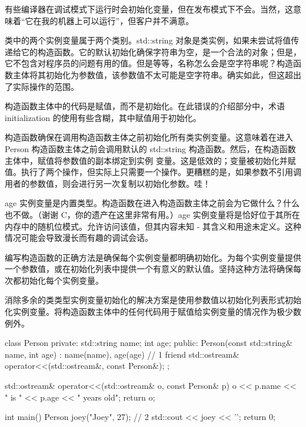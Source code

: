 有些编译器在调试模式下运行时会初始化变量，但在发布模式下不会。当然，这意味着“它在我的机器上可以运行”，但客户并不满意。


类中的两个实例变量属于两个类别。std::string 对象是类实例，如果未尝试将值传递给它的构造函数。它的默认初始化确保字符串为空，是一个合法的对象；但是，它不包含对程序员的问题有用的值。但是等等，名称怎么会是空字符串呢？构造函数主体将其初始化为参数值，该参数值不太可能是空字符串。确实如此，但这超出了实际操作的范围。

构造函数主体中的代码是赋值，而不是初始化。在此错误的介绍部分中，术语 initialization 的使用有些含糊，其中赋值用于初始化。

构造函数确保在调用构造函数主体之前初始化所有类实例变量。这意味着在进入 Person 构造函数主体之前会调用默认的 std::string 构造函数。然后，在构造函数主体中，赋值将参数值的副本绑定到实例 变量。这是低效的；变量被初始化并赋值。执行了两个操作，但实际上只需要一个操作。更糟糕的是，如果参数不引用调用者的参数值，则会进行另一次复制以初始化参数。哇！

age 实例变量是内置类型。构造函数在进入构造函数主体之前会为它做什么？什么也不做。（谢谢 C，你的遗产在这里非常有用。）age 实例变量将是恰好位于其所在内存中的随机位模式。允许访问该值，但其内容未知 - 其含义和用途未定义。这种情况可能会导致漫长而有趣的调试会话。


编写构造函数的正确方法是确保每个实例变量都明确初始化。为每个实例变量提供一个参数值，或在初始化列表中提供一个有意义的默认值。坚持这种方法将确保每次都初始化每个实例变量。

消除多余的类类型实例变量初始化的解决方案是使用参数值以初始化列表形式初始化实例变量。将构造函数主体中的任何代码用于赋值给实例变量的情况作为极少数例外。


\begin{cpp}
class Person {
private:
  std::string name;
  int age;
public:
  Person(const std::string& name, int age) :
  name(name), age(age) {} // 1
  friend std::ostream& operator<<(std::ostream&, const Person&);
};

std::ostream& operator<<(std::ostream& o, const Person& p) {
  o << p.name << " is " << p.age << " years old";
  return o;
}

int main() {
  Person joey("Joey", 27); // 2
  std::cout << joey << '\n';
  return 0;
}
\end{cpp}

